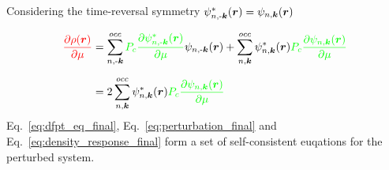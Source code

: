 \begin{frame}[allowframebreaks]
  Considering the time-reversal symmetry $\psi^*_{n,\text{-}\boldsymbol{k}}(\boldsymbol{r}) =
  \psi_{n,\boldsymbol{k}}(\boldsymbol{r})$

  \begin{align}
    \mathcolor{red}{
        \frac{
        \partial \rho(\boldr)
        }{
        \partial \mu
        }
    }
    &=
    \sum_{n,\text{-}\bdm{k}}^{occ}
      \mathcolor{green}{
        P_c
        \frac{
        \partial \psi_{n,\text{-}\bdm{k}}^*(\boldr)
        }{
        \partial \mu
        }
      }
      \psi_{n,\text{-}\bdm{k}}(\boldr)
      +
    \sum_{n,\bdm{k}}^{occ}
      \psi_{n,\bdm{k}}^*(\boldr)
      \mathcolor{green}{
        P_c
        \frac{
        \partial \psi_{n,\bdm{k}}(\boldr)
        }{
        \partial \mu
        }
      } \nonumber \\[6pt]
    &=
    2\sum_{n,\bdm{k}}^{occ}
      \psi_{n,\bdm{k}}^*(\boldr)
      \mathcolor{green}{
        P_c
        \frac{
        \partial \psi_{n,\bdm{k}}(\boldr)
        }{
        \partial \mu
        }
      } \label{eq:density_response_final}
  \end{align}
  Eq.~\ref{eq:dfpt_eq_final}, Eq.~\ref{eq:perturbation_final} and
  Eq.~\ref{eq:density_response_final} form a set of self-consistent euqations
  for the perturbed system.


\end{frame}

